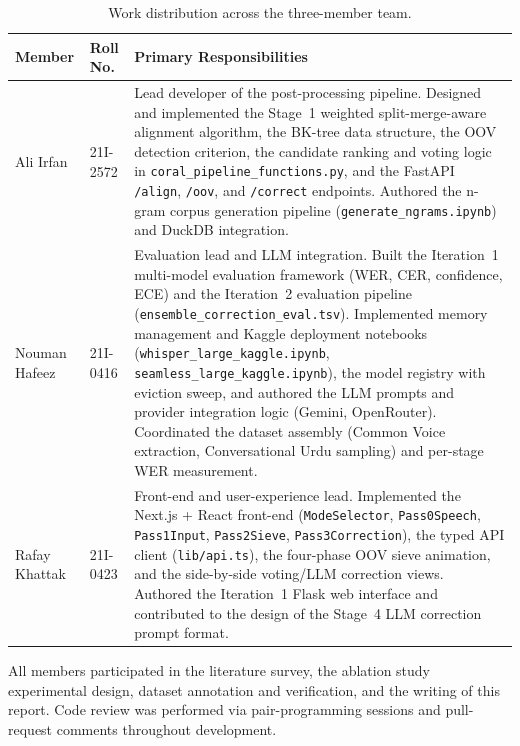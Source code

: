 \begin{table}[h]
    \centering
    \renewcommand{\arraystretch}{1.3}
    \begin{tabularx}{\textwidth}{p{4cm}p{2cm}X}
    \toprule
    \textbf{Member} & \textbf{Roll No.} & \textbf{Primary Responsibilities} \\
    \midrule
    Ali Irfan & 21I-2572 & Lead developer of the post-processing pipeline. Designed and implemented the Stage~1 weighted split-merge-aware alignment algorithm, the BK-tree data structure, the OOV detection criterion, the candidate ranking and voting logic in \texttt{coral\_pipeline\_functions.py}, and the FastAPI \texttt{/align}, \texttt{/oov}, and \texttt{/correct} endpoints. Authored the n-gram corpus generation pipeline (\texttt{generate\_ngrams.ipynb}) and DuckDB integration. \\
    Nouman Hafeez & 21I-0416 & Evaluation lead and LLM integration. Built the Iteration~1 multi-model evaluation framework (WER, CER, confidence, ECE) and the Iteration~2 evaluation pipeline (\texttt{ensemble\_correction\_eval.tsv}). Implemented memory management and Kaggle deployment notebooks (\texttt{whisper\_large\_kaggle.ipynb}, \texttt{seamless\_large\_kaggle.ipynb}), the model registry with eviction sweep, and authored the LLM prompts and provider integration logic (Gemini, OpenRouter). Coordinated the dataset assembly (Common Voice extraction, Conversational Urdu sampling) and per-stage WER measurement. \\
    Rafay Khattak & 21I-0423 & Front-end and user-experience lead. Implemented the Next.js + React front-end (\texttt{ModeSelector}, \texttt{Pass0Speech}, \texttt{Pass1Input}, \texttt{Pass2Sieve}, \texttt{Pass3Correction}), the typed API client (\texttt{lib/api.ts}), the four-phase OOV sieve animation, and the side-by-side voting/LLM correction views. Authored the Iteration~1 Flask web interface and contributed to the design of the Stage~4 LLM correction prompt format. \\
    \bottomrule
    \end{tabularx}
    \caption{Work distribution across the three-member team.}
    \label{tab:work-distribution}
\end{table}

All members participated in the literature survey, the ablation study experimental design, dataset annotation and verification, and the writing of this report. Code review was performed via pair-programming sessions and pull-request comments throughout development.

